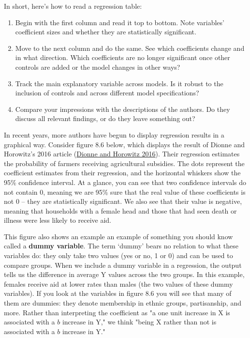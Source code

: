 \documentclass{book}
\begin{document}
In short, here's how to read a regression table:

\begin{enumerate}
\def\labelenumi{\arabic{enumi}.}
\item
  Begin with the first column and read it top to bottom. Note variables'
  coefficient sizes and whether they are statistically significant.
\item
  Move to the next column and do the same. See which coefficients change and
  in what direction. Which coefficients are no longer significant once other
  controls are added or the model changes in other ways?
\item
  Track the main explanatory variable across models. Is it robust to the
  inclusion of controls and across different model specifications?
\item
  Compare your impressions with the descriptions of the authors. Do they
  discuss all relevant findings, or do they leave something out?
\end{enumerate}

In recent years, more authors have begun to display regression results in a
graphical way. Consider figure 8.6 below, which displays the result of Dionne
and Horowitz's 2016 article
(\protect\hyperlink{ref-dionnePoliticalEffectsAgricultural2016}{Dionne and
Horowitz 2016}). Their regression estimates the probability of farmers
receiving agricultural subsidies. The dots represent the coefficient estimates
from their regression, and the horizontal whiskers show the 95\% confidence
interval. At a glance, you can see that two confidence intervals do not
contain 0, meaning we are 95\% sure that the real value of these coefficients
is not 0 -- they are statistically significant. We also see that their value
is negative, meaning that households with a female head and those that had
seen death or illness were less likely to receive aid.

This figure also shows an example an example of something you should know
called a \textbf{dummy variable}. The term `dummy' bears no relation to what
these variables do: they only take two values (yes or no, 1 or 0) and can be
used to compare groups. When we include a dummy variable in a regression, the
output tells us the difference in average Y values across the two groups. In
this example, females receive aid at lower rates than males (the two values of
these dummy variables). If you look at the variables in figure 8.6 you will
see that many of them are dummies: they denote membership in ethnic groups,
partisanship, and more. Rather than interpreting the coefficient as "a one
unit increase in X is associated with a \(b\) increase in Y," we think "being
X rather than not is associated with a \(b\) increase in Y."
\end{document}
